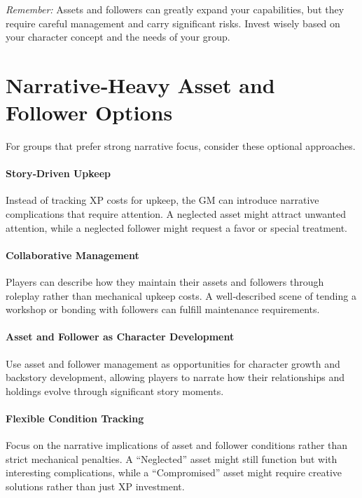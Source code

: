 \emph{Remember:} Assets and followers can greatly expand your capabilities, but they require careful management and carry significant risks. Invest wisely based on your character concept and the needs of your group.

\section{Narrative‑Heavy Asset and Follower Options}
\label{sec:narrative-assets}

For groups that prefer strong narrative focus, consider these optional approaches.

\paragraph{Story‑Driven Upkeep}
\label{sec:story-upkeep}
Instead of tracking XP costs for upkeep, the GM can introduce narrative complications that require attention. A neglected asset might attract unwanted attention, while a neglected follower might request a favor or special treatment.

\paragraph{Collaborative Management}
\label{sec:collab-management}
Players can describe how they maintain their assets and followers through roleplay rather than mechanical upkeep costs. A well‑described scene of tending a workshop or bonding with followers can fulfill maintenance requirements.

\paragraph{Asset and Follower as Character Development}
\label{sec:asset-character-dev}
Use asset and follower management as opportunities for character growth and backstory development, allowing players to narrate how their relationships and holdings evolve through significant story moments.

\paragraph{Flexible Condition Tracking}
\label{sec:flexible-conditions}
Focus on the narrative implications of asset and follower conditions rather than strict mechanical penalties. A ``Neglected'' asset might still function but with interesting complications, while a ``Compromised'' asset might require creative solutions rather than just XP investment.

